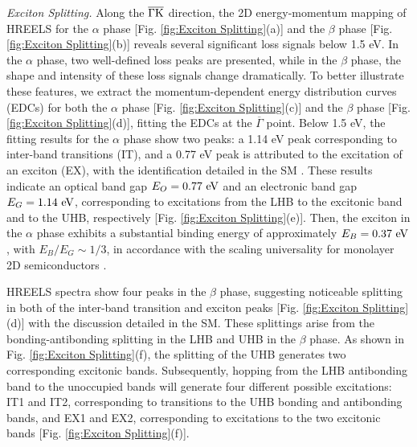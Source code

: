 \documentclass[twocolumn,prl,showpacs,superscriptaddress,longbibliography]{revtex4-2}
\begin{document}
\emph{Exciton Splitting.} Along the $\overline{{\rm \Gamma}}\overline{{\rm K}}$
direction, the 2D energy-momentum mapping of HREELS for the $\alpha$
phase {[}Fig. \ref{fig:Exciton Splitting}(a){]} and the $\beta$
phase {[}Fig. \ref{fig:Exciton Splitting}(b){]} reveals several significant
loss signals below 1.5 eV. In the $\alpha$ phase, two well-defined
loss peaks are presented, while in the $\beta$ phase, the shape and
intensity of these loss signals change dramatically. To better illustrate
these features, we extract the momentum-dependent energy distribution
curves (EDCs) for both the $\alpha$ phase {[}Fig. \ref{fig:Exciton Splitting}(c){]}
and the $\beta$ phase {[}Fig. \ref{fig:Exciton Splitting}(d){]},
fitting the EDCs at the $\overline{\Gamma}$ point. Below 1.5 eV,
the fitting results for the $\alpha$ phase show two peaks: a 1.14
eV peak corresponding to inter-band transitions (IT), and a 0.77 eV
peak is attributed to the excitation of an exciton (EX), with the
identification detailed in the SM \citep{SM}. These results indicate
an optical band gap $E_{O}=0.77\ {\rm eV}$ and an electronic band
gap $E_{G}=1.14\ {\rm eV}$, corresponding to excitations from the
LHB to the excitonic band and to the UHB, respectively {[}Fig. \ref{fig:Exciton Splitting}(e){]}.
Then, the exciton in the $\alpha$ phase exhibits a substantial binding
energy of approximately $E_{B}=0.37\ {\rm eV}$, with $E_{B}/E_{G}\sim1/3$,
in accordance with the scaling universality for monolayer 2D semiconductors
\citep{RN578}.

HREELS spectra show four peaks in the $\beta$ phase, suggesting noticeable
splitting in both of the inter-band transition and exciton peaks {[}Fig.
\ref{fig:Exciton Splitting}(d){]} with the discussion detailed in
the SM\citep{SM}. These splittings arise from the bonding-antibonding
splitting in the LHB and UHB in the $\beta$ phase. As shown in Fig.
\ref{fig:Exciton Splitting}(f), the splitting of the UHB generates
two corresponding excitonic bands. Subsequently, hopping from the
LHB antibonding band to the unoccupied bands will generate four different
possible excitations: IT1 and IT2, corresponding to transitions to
the UHB bonding and antibonding bands, and EX1 and EX2, corresponding
to excitations to the two excitonic bands {[}Fig. \ref{fig:Exciton Splitting}(f){]}.
\end{document}
